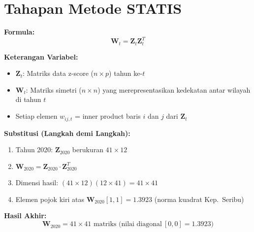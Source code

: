 \documentclass[11pt,a4paper]{article}
\begin{document}
\section{Tahapan Metode STATIS}
\begin{tcolorbox}[formula_box, title={13. Intra-struktur: Matriks Kemiripan Tahunan ($\mathbf{W}_t$)}]
\textbf{Formula:}
\[ \mathbf{W}_t = \mathbf{Z}_t \mathbf{Z}_t^T \]

\textbf{Keterangan Variabel:}
\begin{itemize}
  \item $\mathbf{Z}_t$: Matriks data z-score ($n \times p$) tahun ke-$t$
  \item $\mathbf{W}_t$: Matriks simetri ($n \times n$) yang merepresentasikan kedekatan antar wilayah di tahun $t$
  \item Setiap elemen $w_{ij,t}$ = inner product baris $i$ dan $j$ dari $\mathbf{Z}_t$
\end{itemize}

\textbf{Substitusi (Langkah demi Langkah):}
\begin{enumerate}
  \item Tahun 2020: $\mathbf{Z}_{2020}$ berukuran $41 \times 12$
  \item $\mathbf{W}_{2020} = \mathbf{Z}_{2020} \cdot \mathbf{Z}_{2020}^T$
  \item Dimensi hasil: $(41 \times 12)(12 \times 41) = 41 \times 41$
  \item Elemen pojok kiri atas $\mathbf{W}_{2020}[1,1] = 1.3923$ (norma kuadrat Kep.\ Seribu)
\end{enumerate}

\textbf{Hasil Akhir:}
\[ \mathbf{W}_{2020} = 41 \times 41 \text{ matriks (nilai diagonal}\ [0,0] = 1.3923) \]
\end{tcolorbox}
\end{document}
